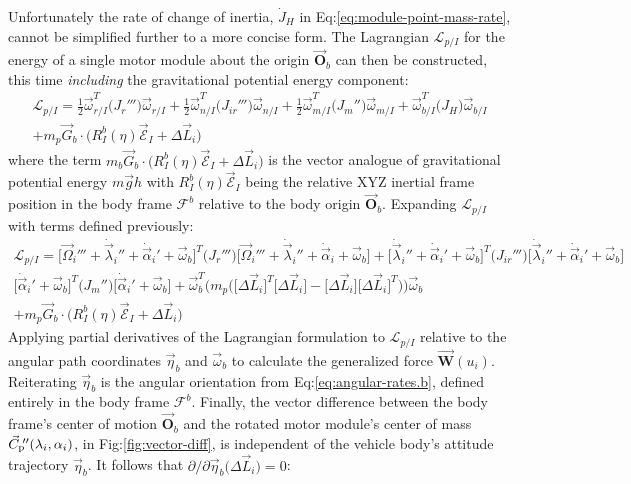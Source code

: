 Unfortunately the rate of change of inertia, $\dot{J}_H$ in Eq:\ref{eq:module-point-mass-rate}, cannot be simplified further to a more concise form. The Lagrangian $\mathcal{L}_{p/I}$ for the energy of a single motor module about the origin $\vec{\mathbf{O}}_b$ can then be constructed, this time \emph{including} the gravitational potential energy component:
\begin{multline}
\mathcal{L}_{p/I}=\frac{1}{2}\vec{\omega}_{r/I}^T\big(J_r'''\big)\vec{\omega}_{r/I}+\frac{1}{2}\vec{\omega}_{n/I}^T\big(J_{ir}'''\big)\vec{\omega}_{n/I}+\frac{1}{2}\vec{\omega}_{m/I}^T\big(J_m''\big)\vec{\omega}_{m/I}+\vec{\omega}_{b/I}^T\big(J_H)\vec{\omega}_{b/I}\\+m_p\vec{G}_b\cdot\big(R_I^b(\eta)\vec{\mathcal{E}}_I+\Delta \vec{L}_i\big)
\end{multline}
where the term $m_b\vec{G}_b\cdot\big(R_I^b(\eta)\vec{\mathcal{E}}_I+\Delta \vec{L}_i\big)$ is the vector analogue of gravitational potential energy $m\vec{g}h$ with $R_I^b(\eta)\vec{\mathcal{E}}_I$ being the relative XYZ inertial frame position in the body frame $\mathcal{F}^b$ relative to the body origin $\vec{\mathbf{O}}_b$. Expanding $\mathcal{L}_{p/I}$ with terms defined previously:
\begin{multline}
\mathcal{L}_{p/I}=\Big[\vec{\Omega}_i'''+\dot{\vec{\lambda}}_i''+\dot{\vec{\alpha}}_i'+\vec{\omega}_b\Big]^T\big(J_r'''\big)\Big[\vec{\Omega}_i'''+\dot{\vec{\lambda}}_i''+\dot{\vec{\alpha}}_i+\vec{\omega}_b\Big]+\Big[\dot{\vec{\lambda}}_i''+\dot{\vec{\alpha}}_i'+\vec{\omega}_b\Big]^T\big(J_{ir}'''\big)\Big[\dot{\vec{\lambda}}_i''+\dot{\vec{\alpha}}_i'+\vec{\omega}_b\Big]
\\
\Big[\dot{\vec{\alpha}}_i'+\vec{\omega}_b\Big]^T\big(J_m''\big)\Big[\dot{\vec{\alpha}}_i'+\vec{\omega}_b\Big]+\vec{\omega}_{b}^T\big(m_p\Big(\big[\Delta \vec{L}_i\big]^T\big[\Delta \vec{L}_i\big]-\big[\Delta \vec{L}_i\big]\big[\Delta \vec{L}_i\big]^T\Big)\big)\vec{\omega}_{b}
\\
+m_p\vec{G}_b\cdot\big(R_I^b(\eta)\vec{\mathcal{E}}_I+\Delta \vec{L}_i\big)
\end{multline}
Applying partial derivatives of the Lagrangian formulation to $\mathcal{L}_{p/I}$ relative to the angular path coordinates $\vec{\eta}_b$ and $\vec{\omega}_b$ to calculate the generalized force $\vec{\mathbf{W}}(u_i)$. Reiterating $\vec{\eta}_b$ is the angular orientation from Eq:\ref{eq:angular-rates.b}, defined entirely in the body frame $\mathcal{F}^b$. Finally, the vector difference between the body frame's center of motion $\vec{\mathbf{O}}_b$ and the rotated motor module's center of mass $\vec{C}_\text{p}\text{}\hspace{-2pt}''(\lambda_i,\alpha_i)$, in Fig:\ref{fig:vector-diff}, is independent of the vehicle body's attitude trajectory $\vec{\eta}_b$. It follows that $\partial/\partial\vec{\eta}_b\big(\Delta \vec{L}_i\big) = 0$:
